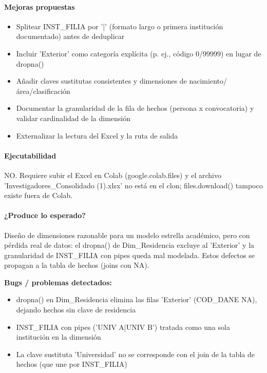 \paragraph{Mejoras propuestas}
\begin{itemize}
  \item Splitear INST\_FILIA por '|' (formato largo o primera institución documentado) antes de deduplicar
  \item Incluir 'Exterior' como categoría explícita (p. ej., código 0/99999) en lugar de dropna()
  \item Añadir claves sustitutas consistentes y dimensiones de nacimiento/área/clasificación
  \item Documentar la granularidad de la fila de hechos (persona x convocatoria) y validar cardinalidad de la dimensión
  \item Externalizar la lectura del Excel y la ruta de salida
\end{itemize}

\paragraph{Ejecutabilidad}
NO. Requiere subir el Excel en Colab (google.colab.files) y el archivo 'Investigadores\_Consolidado (1).xlsx' no está en el clon; files.download() tampoco existe fuera de Colab.

\paragraph{¿Produce lo esperado?}
Diseño de dimensiones razonable para un modelo estrella académico, pero con pérdida real de datos: el dropna() de Dim\_Residencia excluye al 'Exterior' y la granularidad de INST\_FILIA con pipes queda mal modelada. Estos defectos se propagan a la tabla de hechos (joins con NA).

\begin{tcolorbox}[riesgo]
\textbf{Bugs / problemas detectados:}
\begin{itemize}
  \item dropna() en Dim\_Residencia elimina las filas 'Exterior' (COD\_DANE NA), dejando hechos sin clave de residencia
  \item INST\_FILIA con pipes ('UNIV A|UNIV B') tratada como una sola institución en la dimensión
  \item La clave sustituta 'Universidad' no se corresponde con el join de la tabla de hechos (que une por INST\_FILIA)
\end{itemize}
\end{tcolorbox}

